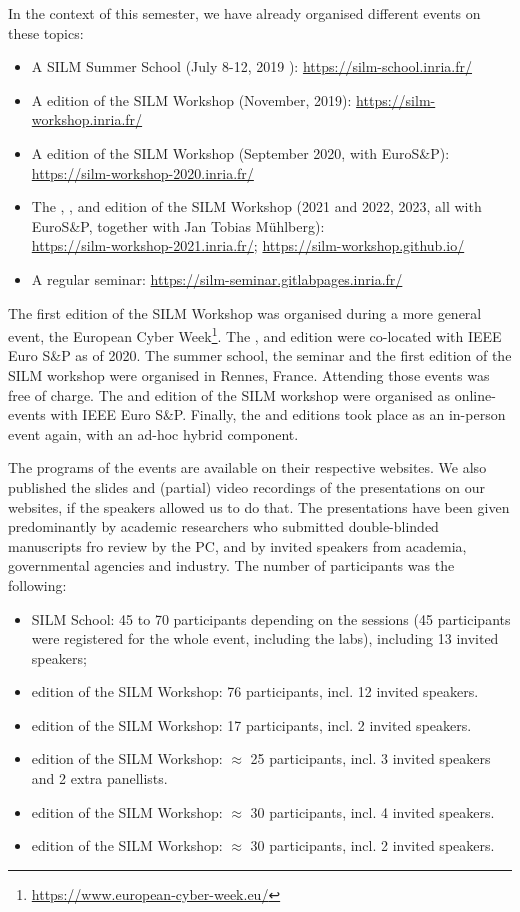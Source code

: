 \documentclass[a4paper,11pt]{article}
\begin{document}
In the context of this semester, we have already organised different events
on these topics:
%
\begin{itemize}
%
    \item A SILM Summer School (July 8-12, 2019 ):
\url{https://silm-school.inria.fr/}
%
    \item A  edition of the SILM Workshop (November, 2019):
\url{https://silm-workshop.inria.fr/}
%
    \item A  edition of the SILM Workshop (September 2020, with
EuroS\&P): \\ \url{https://silm-workshop-2020.inria.fr/}
%
    \item{The , , and  edition of the SILM Workshop (2021 and
2022, 2023, all with EuroS\&P, together with Jan Tobias M\"uhlberg): \\
\url{https://silm-workshop-2021.inria.fr/};
\url{https://silm-workshop.github.io/}
  }
%
    \item A regular seminar: \url{https://silm-seminar.gitlabpages.inria.fr/}
%
\end{itemize}

The first edition of the SILM Workshop was organised during a more general
event, the European Cyber
Week\footnote{\url{https://www.european-cyber-week.eu/}}.  The ,
 and  edition were co-located with IEEE Euro S\&P as of 2020. 
% 
The summer school, the seminar and the first edition of the SILM workshop
were organised in Rennes, France. Attending those events was free of
charge. The  and  edition of the SILM workshop were organised
as online-events with IEEE Euro S\&P. Finally, the  and 
editions took
place as an in-person event again, with an ad-hoc hybrid component.

The programs of the events are available on their respective websites. We
also published the slides and (partial) video recordings of the presentations on
our websites, if the speakers allowed us to do that. The presentations
have been given predominantly by academic researchers who submitted
double-blinded manuscripts fro review by the PC, and by invited speakers from academia, governmental agencies
and industry. The number of participants was the following:
%
\begin{itemize}
%
    \item SILM School: 45 to 70 participants depending on the sessions (45
participants were registered for the whole event, including the labs),
including 13 invited speakers;
%
    \item {} edition of the SILM Workshop: 76 participants, incl.
12 invited speakers.
%
    \item {} edition of the SILM Workshop: 17 participants, incl.
2 invited speakers.
%
    \item {} edition of the SILM Workshop: $\approx$ 25 participants,
incl. 3 invited speakers and 2 extra panellists.
%
    \item {} edition of the SILM Workshop: $\approx$ 30 participants,
incl. 4 invited speakers.
%
    \item {} edition of the SILM Workshop: $\approx$ 30 participants,
incl. 2 invited speakers.
\end{itemize}
\end{document}
